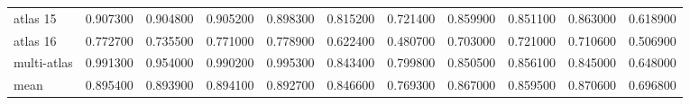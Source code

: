 \documentclass[a4paper]{article}
\begin{document}
\begin{landscape}
\begin{tabular}{lrrrrrrrrrr}
atlas 15 & 0.907300 & 0.904800 & 0.905200 & 0.898300 & 0.815200 & 0.721400 & 0.859900 & 0.851100 & 0.863000 & 0.618900 \\
atlas 16 & 0.772700 & 0.735500 & 0.771000 & 0.778900 & 0.622400 & 0.480700 & 0.703000 & 0.721000 & 0.710600 & 0.506900 \\
multi-atlas & 0.991300 & 0.954000 & 0.990200 & 0.995300 & 0.843400 & 0.799800 & 0.850500 & 0.856100 & 0.845000 & 0.648000 \\
mean & 0.895400 & 0.893900 & 0.894100 & 0.892700 & 0.846600 & 0.769300 & 0.867000 & 0.859500 & 0.870600 & 0.696800 \\
\bottomrule
\end{tabular}

\end{landscape}
\end{document}
